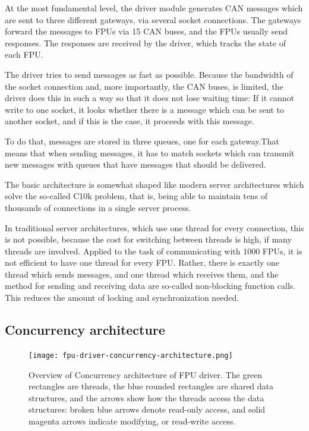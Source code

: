 \documentclass[fontsize=12,a4paper]{scrartcl}
\begin{document}
At the most fundamental level, the driver module generates CAN
messages which are sent to three different gateways, via several
socket connections. The gateways forward the messages to FPUs via 15
CAN buses, and the FPUs usually send responses. The responses are
received by the driver, which tracks the state of each FPU.

The driver tries to send messages as fast as possible. Because the
bandwidth of the socket connection and, more importantly, the CAN
buses, is limited, the driver does this in such a way so that it does
not lose waiting time: If it cannot write to one socket, it looks
whether there is a message which can be sent to another socket, and if
this is the case, it proceeds with this message.

To do that, messages are stored in three queues, one for each
gateway.That means that when sending messages, it has to match sockets
which can transmit new messages with queues that have messages that
should be delivered.

The basic architecture is somewhat shaped like modern server
architectures which solve the so-called C10k problem, that is, being
able to maintain tens of thousands of connections in a single server
process\cite{Kegel:C10kProblem}\cite{WP:C10kProblem}.

In traditional server architectures, which use one thread for every
connection, this is not possible, because the cost for switching
between threads is high, if many threads are involved. Applied to the
task of communicating with 1000 FPUs, it is not efficient to have one
thread for every FPU. Rather, there is exactly one thread which sends
messages, and one thread which receives them, and the method for
sending and receiving data are so-called non-blocking function calls.
This reduces the amount of locking and synchronization needed.

\subsection{Concurrency architecture}
\begin{figure}
\texttt{[image: fpu-driver-concurrency-architecture.png]}
\caption[Overview of Concurrency architecture of FPU driver]{Overview
  of Concurrency architecture of FPU driver. The green rectangles are
  threads, the blue rounded rectangles are shared data structures, and
  the arrows show how the threads access the data structures: broken
  blue arrows denote read-only access, and solid magenta arrows
  indicate modifying, or read-write access.}
\label{fig:overview}
\end{figure}
\end{document}
